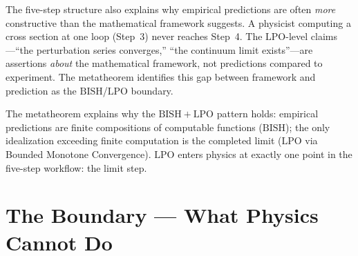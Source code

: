 \documentclass[11pt,a4paper]{report}
\theoremstyle{plain}
\theoremstyle{definition}
\theoremstyle{remark}
\newcommand{\BISH}{\mathrm{BISH}}
\newcommand{\LPO}{\mathrm{LPO}}
\begin{document}
The five-step structure also explains why empirical predictions are often \emph{more} constructive than the mathematical framework suggests. A physicist computing a cross section at one loop (Step~3) never reaches Step~4. The $\LPO$-level claims---``the perturbation series converges,'' ``the continuum limit exists''---are assertions \emph{about} the mathematical framework, not predictions compared to experiment. The metatheorem identifies this gap between framework and prediction as the $\BISH$/$\LPO$ boundary.

\begin{chapterbox}
The metatheorem explains why the $\BISH+\LPO$ pattern holds: empirical predictions are finite compositions of computable functions ($\BISH$); the only idealization exceeding finite computation is the completed limit ($\LPO$ via Bounded Monotone Convergence). $\LPO$ enters physics at exactly one point in the five-step workflow: the limit step.
\end{chapterbox}

\chapter{The Boundary --- What Physics Cannot Do}
\end{document}
